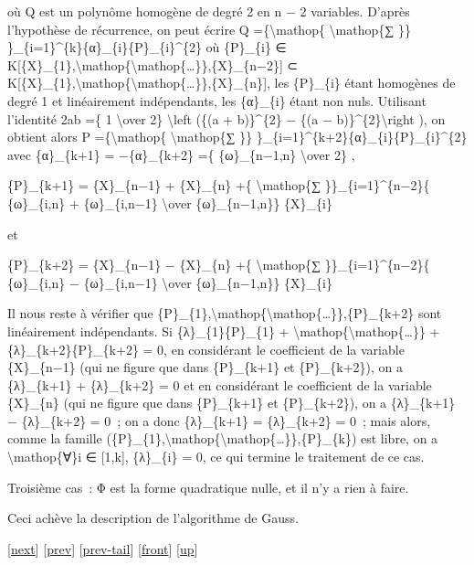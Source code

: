 \documentclass[]{article}
\begin{document}
où Q est un polynôme homogène de degré 2 en n − 2 variables. D'après
l'hypothèse de récurrence, on peut écrire Q =\{\textbackslash{}mathop\{
\textbackslash{}mathop\{∑ \}\}
\}\_\{i=1\}\^{}\{k\}\{α\}\_\{i\}\{P\}\_\{i\}\^{}\{2\} où \{P\}\_\{i\} ∈
K{[}\{X\}\_\{1\},\textbackslash{}mathop\{\textbackslash{}mathop\{\ldots{}\}\},\{X\}\_\{n−2\}{]}
⊂
K{[}\{X\}\_\{1\},\textbackslash{}mathop\{\textbackslash{}mathop\{\ldots{}\}\},\{X\}\_\{n\}{]},
les \{P\}\_\{i\} étant homogènes de degré 1 et linéairement
indépendants, les \{α\}\_\{i\} étant non nuls. Utilisant l'identité 2ab
=\{ 1 \textbackslash{}over 2\} \textbackslash{}left (\{(a +
b)\}\^{}\{2\} − \{(a − b)\}\^{}\{2\}\textbackslash{}right ), on obtient
alors P =\{\textbackslash{}mathop\{ \textbackslash{}mathop\{∑ \}\}
\}\_\{i=1\}\^{}\{k+2\}\{α\}\_\{i\}\{P\}\_\{i\}\^{}\{2\} avec
\{α\}\_\{k+1\} = −\{α\}\_\{k+2\} =\{ \{ω\}\_\{n−1,n\}
\textbackslash{}over 2\} ,

\{P\}\_\{k+1\} = \{X\}\_\{n−1\} + \{X\}\_\{n\} +\{
\textbackslash{}mathop\{∑ \}\}\_\{i=1\}\^{}\{n−2\}\{ \{ω\}\_\{i,n\} +
\{ω\}\_\{i,n−1\} \textbackslash{}over \{ω\}\_\{n−1,n\}\} \{X\}\_\{i\}

et

\{P\}\_\{k+2\} = \{X\}\_\{n−1\} − \{X\}\_\{n\} +\{
\textbackslash{}mathop\{∑ \}\}\_\{i=1\}\^{}\{n−2\}\{ \{ω\}\_\{i,n\} −
\{ω\}\_\{i,n−1\} \textbackslash{}over \{ω\}\_\{n−1,n\}\} \{X\}\_\{i\}

Il nous reste à vérifier que
\{P\}\_\{1\},\textbackslash{}mathop\{\textbackslash{}mathop\{\ldots{}\}\},\{P\}\_\{k+2\}
sont linéairement indépendants. Si \{λ\}\_\{1\}\{P\}\_\{1\} +
\textbackslash{}mathop\{\textbackslash{}mathop\{\ldots{}\}\} +
\{λ\}\_\{k+2\}\{P\}\_\{k+2\} = 0, en considérant le coefficient de la
variable \{X\}\_\{n−1\} (qui ne figure que dans \{P\}\_\{k+1\} et
\{P\}\_\{k+2\}), on a \{λ\}\_\{k+1\} + \{λ\}\_\{k+2\} = 0 et en
considérant le coefficient de la variable \{X\}\_\{n\} (qui ne figure
que dans \{P\}\_\{k+1\} et \{P\}\_\{k+2\}), on a \{λ\}\_\{k+1\} −
\{λ\}\_\{k+2\} = 0~; on a donc \{λ\}\_\{k+1\} = \{λ\}\_\{k+2\} = 0~;
mais alors, comme la famille
(\{P\}\_\{1\},\textbackslash{}mathop\{\textbackslash{}mathop\{\ldots{}\}\},\{P\}\_\{k\})
est libre, on a \textbackslash{}mathop\{∀\}i ∈ {[}1,k{]}, \{λ\}\_\{i\} =
0, ce qui termine le traitement de ce cas.

Troisième cas~: Φ est la forme quadratique nulle, et il n'y a rien à
faire.

Ceci achève la description de l'algorithme de Gauss.

{[}\href{coursse70.html}{next}{]} {[}\href{coursse68.html}{prev}{]}
{[}\href{coursse68.html\#tailcoursse68.html}{prev-tail}{]}
{[}\href{coursse69.html}{front}{]}
{[}\href{coursch13.html\#coursse69.html}{up}{]}
\end{document}

